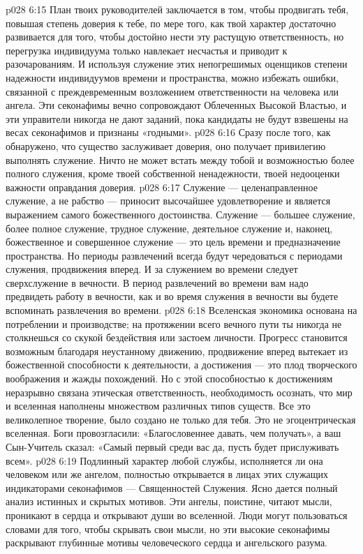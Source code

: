 \vs p028 6:15 \pc План твоих руководителей заключается в том, чтобы продвигать тебя, повышая степень доверия к тебе, по мере того, как твой характер достаточно развивается для того, чтобы достойно нести эту растущую ответственность, но перегрузка индивидуума только навлекает несчастья и приводит к разочарованиям. И используя служение этих непогрешимых оценщиков степени надежности индивидуумов времени и пространства, можно избежать ошибки, связанной с преждевременным возложением ответственности на человека или ангела. Эти секонафимы вечно сопровождают Облеченных Высокой Властью, и эти управители никогда не дают заданий, пока кандидаты не будут взвешены на весах секонафимов и признаны «годными».
\vs p028 6:16 \pc {}\bibnobreakspace {} Сразу после того, как обнаружено, что существо заслуживает доверия, оно получает привилегию выполнять служение. Ничто не может встать между тобой и возможностью более полного служения, кроме твоей собственной ненадежности, твоей недооценки важности оправдания доверия.
\vs p028 6:17 Служение --- целенаправленное служение, а не рабство --- приносит высочайшее удовлетворение и является выражением самого божественного достоинства. Служение --- большее служение, более полное служение, трудное служение, деятельное служение и, наконец, божественное и совершенное служение --- это цель времени и предназначение пространства. Но периоды развлечений всегда будут чередоваться с периодами служения, продвижения вперед. И за служением во времени следует сверхслужение в вечности. В период развлечений во времени вам надо предвидеть работу в вечности, как и во время служения в вечности вы будете вспоминать развлечения во времени.
\vs p028 6:18 \pc Вселенская экономика основана на потреблении и производстве; на протяжении всего вечного пути ты никогда не столкнешься со скукой бездействия или застоем личности. Прогресс становится возможным благодаря неустанному движению, продвижение вперед вытекает из божественной способности к деятельности, а достижения --- это плод творческого воображения и жажды похождений. Но с этой способностью к достижениям неразрывно связана этическая ответственность, необходимость осознать, что мир и вселенная наполнены множеством различных типов существ. Все это великолепное творение,  было создано не только для тебя. Это не эгоцентрическая вселенная. Боги провозгласили: «Благословеннее давать, чем получать», а ваш Сын\hyp{}Учитель сказал: «Самый первый среди вас да, пусть будет прислуживать всем».
\vs p028 6:19 \pc Подлинный характер любой службы, исполняется ли она человеком или же ангелом, полностью открывается в лицах этих служащих индикаторами секонафимов --- Священностей Служения. Ясно дается полный анализ истинных и скрытых мотивов. Эти ангелы, поистине, читают мысли, проникают в сердца и открывают души во вселенной. Люди могут пользоваться словами для того, чтобы скрывать свои мысли, но эти высокие секонафимы раскрывают глубинные мотивы человеческого сердца и ангельского разума.
